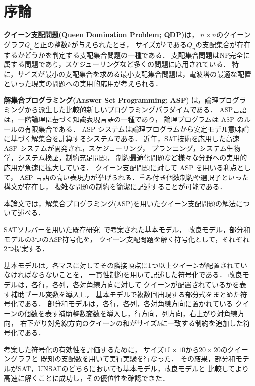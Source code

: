\chapter{序論}\label{chap:introduction}

\textbf{クイーン支配問題(Queen Domination Problem; QDP)}は，
$n \times n$のクイーングラフ$Q_{n}$と正の整数$k$が与えられたとき，
サイズが$k$である$Q_{n}$の支配集合が存在するかどうかを判定する支配集合問題の一種である．
支配集合問題はNP完全に属する問題であり，スケジューリングなど多くの問題に応用されている．
特に，サイズが最小の支配集合を求める最小支配集合問題は，電波塔の最適な配置といった現実の問題への実用的応用が考えられる．


\textbf{解集合プログラミング(Answer Set Programming; ASP}\cite{%
  Baral03:cambridge,%
  Gelfond88:iclp,%
  Inoue08:jssst,%
  Niemela99:amai})
は，論理プログラミングから派生した比較的新しいプログラミングパラダイムである．
ASP言語は，一階論理に基づく知識表現言語の一種であり，
論理プログラムは ASP のルールの有限集合である．
ASP システムは論理プログラムから安定モデル意味論に基づく解集合を計算するシステムである．
近年，SAT技術を応用した高速 ASP システムが開発され，スケジューリング，
プランニング，システム生物学，システム検証，制約充足問題，
制約最適化問題など様々な分野への実用的応用が急速に拡大している．
クイーン支配問題に対して ASP を用いる利点として，
ASP 言語の高い表現力が挙げられる．重み付き個数制約や選択子といった構文が存在し，
複雑な問題の制約を簡潔に記述することが可能である．

本論文では，解集合プログラミング(ASP)を用いたクイーン支配問題の解法について述べる．

SATソルバーを用いた既存研究~\cite{yamamoto21}で考案された基本モデル，
改良モデル，部分和モデルの3つのASP符号化を，
クイーン支配問題を解く符号化として，それぞれ2つ提案する．

基本モデルは，各マスに対してその隣接頂点に1つ以上クイーンが配置されていなければならないことを，
一貫性制約を用いて記述した符号化である．
改良モデルは，各行，各列，各対角線方向に対して
クイーンが配置されているかを表す補助ブール変数を導入し，
基本モデルで複数回出現する部分式をまとめた符号化である．
部分和モデルは，各行，各列，各対角線方向に置かれている
クイーンの個数を表す補助整数変数を導入し，行方向，列方向，右上がり対角線方向，
右下がり対角線方向のクイーンの和がサイズ$k$に一致する制約を追加した符号化である．

考案した符号化の有効性を評価するために，
サイズ$10 \times 10$から$20 \times 20$のクイーングラフと
既知の支配数を用いて実行実験を行なった．
その結果，部分和モデルがSAT，UNSATのどちらにおいても基本モデル，改良モデルと
比較してより高速に解くことに成功し，その優位性を確認できた．

